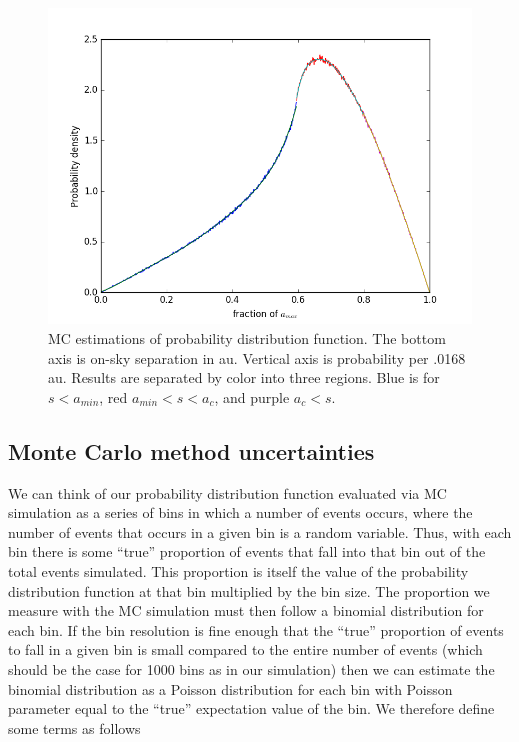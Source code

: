 \documentclass{article}
\begin{document}
	\begin{figure}
		\includegraphics[width = \linewidth]{MC_corrected.png}
		\caption{MC estimations of probability distribution function. The bottom axis is on-sky separation in au. Vertical axis is probability per .0168 au. Results are separated by color into three regions. Blue is for $s<a_{min}$, red $a_{min} < s < a_{c}$, and purple $a_{c} < s$. }
		\label{fig:MC}
	\end{figure}
	
	\subsection{Monte Carlo method uncertainties}
	We can think of our probability distribution function evaluated via MC simulation as a series of bins in which a number of events occurs, where the number of events that occurs in a given bin is a random variable. Thus, with each bin there is some “true” proportion of events that fall into that bin out of the total events simulated. This proportion is itself the value of the probability distribution function at that bin multiplied by the bin size. The proportion we measure with the MC simulation must then follow a binomial distribution for each bin. If the bin resolution is fine enough that the “true” proportion of events to fall in a given bin is small compared to the entire number of events (which should be the case for 1000 bins as in our simulation) then we can estimate the binomial distribution as a Poisson distribution for each bin with Poisson parameter equal to the “true” expectation value of the bin. We therefore define some terms as follows
	
\end{document}

